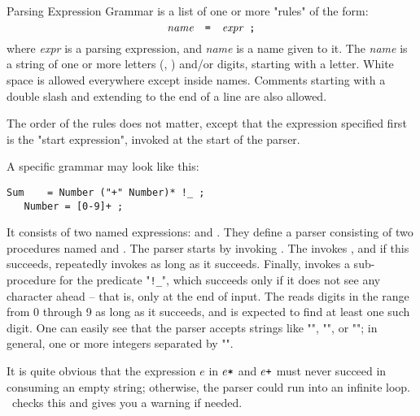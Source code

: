 Parsing Expression Grammar is a list of one or more "rules" of the form:
%
\begin{equation*}
\textit{name}\quad \texttt{=}\quad \textit{expr} \;\;\texttt{;}
\end{equation*}
%
where \textit{expr} is a parsing expression,
and \textit{name} is a name given to it.
The \textit{name} is a string of one or more letters (, ) and/or digits,
starting with a letter. 
White space is allowed everywhere except inside names.
Comments starting with a double slash and extending to the end of a line are also allowed.

The order of the rules does not matter, except that the expression specified first
is the "start expression", invoked at the start of the parser.

\medskip
A specific grammar may look like this:

\smallskip
\small
\begin{Verbatim}[frame=single,framesep=2mm,samepage=true,xleftmargin=15mm,xrightmargin=15mm,baselinestretch=0.8]
   Sum    = Number ("+" Number)* !_ ;
   Number = [0-9]+ ;
\end{Verbatim}
\normalsize
%
It consists of two named expressions:  and .
They define a parser consisting of
two procedures named  and .
The parser starts by invoking .
The  invokes , and if this succeeds,
repeatedly invokes  as long as it succeeds.
Finally, 
invokes a sub-procedure for the predicate "\verb#!_#",
which succeeds only if it does not see any character ahead --
that is, only at the end of input.
The  reads digits in the range from 
0 through 9 as long as it succeeds,
and is expected to find at least one such digit.
%
One can easily see that the parser
accepts strings like "",  "", or "";
in general, one or more integers separated by "\tx{+}".

It is quite obvious that
the expression $e$ in $e\texttt{*}$ and $e\texttt{+}$ must never succeed
in consuming an empty string;
otherwise, the parser could run into an infinite loop.
\Mouse\ checks this and gives you a warning if needed.

